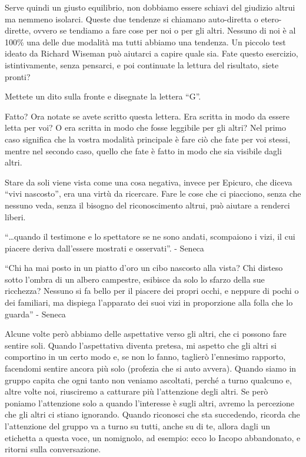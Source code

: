 \documentclass[12pt]{book} %
\begin{document}
Serve quindi un giusto equilibrio, non dobbiamo essere schiavi del giudizio altrui ma nemmeno isolarci. Queste due
tendenze si chiamano auto-diretta o etero-dirette, ovvero se tendiamo a fare cose per noi o per gli altri. Nessuno di
noi è al 100\% una delle due modalità ma tutti abbiamo una tendenza. Un piccolo test ideato da Richard Wiseman può
aiutarci a capire quale sia. Fate questo esercizio, istintivamente, senza pensarci, e poi continuate
la lettura del risultato, siete pronti?

Mettete un dito sulla fronte e disegnate la lettera “G”.

Fatto? Ora notate se avete scritto questa lettera. Era scritta in modo da essere letta per voi? O era scritta in modo che
fosse leggibile per gli altri? Nel primo caso significa che la vostra modalità principale è fare ciò che fate per voi
stessi, mentre nel secondo caso, quello che fate è fatto in modo che sia visibile dagli altri.

Stare da soli viene vista come una cosa negativa, invece per Epicuro, che diceva “vivi nascosto”, era una virtù da
ricercare. Fare le cose che ci piacciono, senza che nessuno veda, senza il bisogno del riconoscimento altrui, può aiutare a renderci liberi.

“…quando il testimone e lo spettatore se ne sono andati, scompaiono i vizi, il cui piacere deriva dall’essere mostrati e osservati”. - Seneca

“Chi ha mai posto in un piatto d’oro un cibo nascosto alla vista? Chi disteso sotto l’ombra di un albero campestre, esibisce da solo lo sfarzo della sue ricchezza? Nessuno si fa bello per il piacere dei propri occhi, e neppure di pochi o dei familiari, ma dispiega l’apparato dei suoi vizi in proporzione alla folla che lo guarda” - Seneca

Alcune volte però abbiamo delle aspettative verso gli altri, che ci possono fare sentire soli. Quando
l'aspettativa diventa pretesa, mi aspetto che gli altri si comportino in un certo modo e, se non
lo fanno, taglierò l'ennesimo rapporto, facendomi sentire ancora più solo (profezia che si auto avvera). Quando siamo
in gruppo capita che ogni tanto non veniamo ascoltati, perché a turno qualcuno e, altre volte noi, riusciremo a
catturare più l'attenzione degli altri. Se però poniamo l'attenzione solo a
quando l'interesse è sugli altri, avremo la percezione che gli altri ci stiano ignorando. Quando
riconosci che sta succedendo, ricorda che l'attenzione del gruppo va a turno su tutti, anche su di
te, allora dagli un etichetta a questa voce, un nomignolo, ad esempio: ecco lo Iacopo abbandonato, e ritorni sulla
conversazione.
\end{document}
